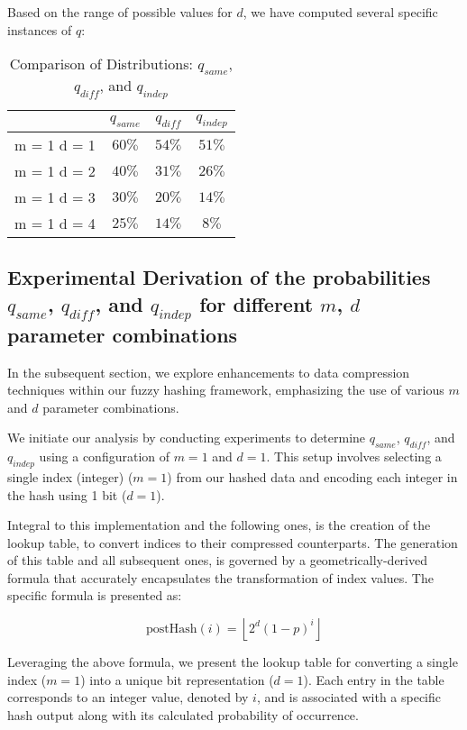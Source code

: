 Based on the range of possible values for \(d\), we have computed several specific instances of \(q\):
\begin{table}[H]
    \centering
    \renewcommand{\arraystretch}{1.25}\begin{tabular}{|c|c|c|c|}
        \hline
        & $q_{same}$ & $q_{diff}$ & $q_{indep}$\\
        \hline
        m = 1 d = 1 & $60\%$ & $54\%$ & $51\%$\\
        m = 1 d = 2 & $40\%$ & $31\%$ & $26\%$\\
        m = 1 d = 3 & $30\%$ & $20\%$ & $14\%$\\
        m = 1 d = 4 & $25\%$ & $14\%$ & $8\%$\\
        \hline
    \end{tabular}
\caption{Comparison of Distributions: $q_{same}$, $q_{diff}$, and $q_{indep}$}
\end{table}

\subsection{Experimental Derivation of the probabilities $q_{same}$, $q_{diff}$, and $q_{indep}$ for different \(m\), \(d\) parameter combinations}

In the subsequent section, we explore enhancements to data compression techniques within our fuzzy hashing framework, emphasizing the use of various \(m\) and \(d\) parameter combinations.

We initiate our analysis by conducting experiments to determine \(q_{same}\), \(q_{diff}\), and \(q_{indep}\) using a configuration of \(m=1\) and \(d=1\). This setup involves selecting a single index (integer) (\(m=1\)) from our hashed data and encoding each integer in the hash using 1 bit (\(d=1\)). 

Integral to this implementation and the following ones, is the creation of the lookup table, to convert indices to their compressed counterparts. The generation of this table and all subsequent ones, is governed by a geometrically-derived formula that accurately encapsulates the transformation of index values. The specific formula is presented as:

\[ 
\text{postHash}(i) = \left\lfloor 2^d \left(1 - p\right)^i \right\rfloor
\]

Leveraging the above formula, we present the lookup table for converting a single index (\(m = 1\)) into a unique bit representation (\(d=1\)). Each entry in the table corresponds to an integer value, denoted by \(i\), and is associated with a specific hash output along with its calculated probability of occurrence.

